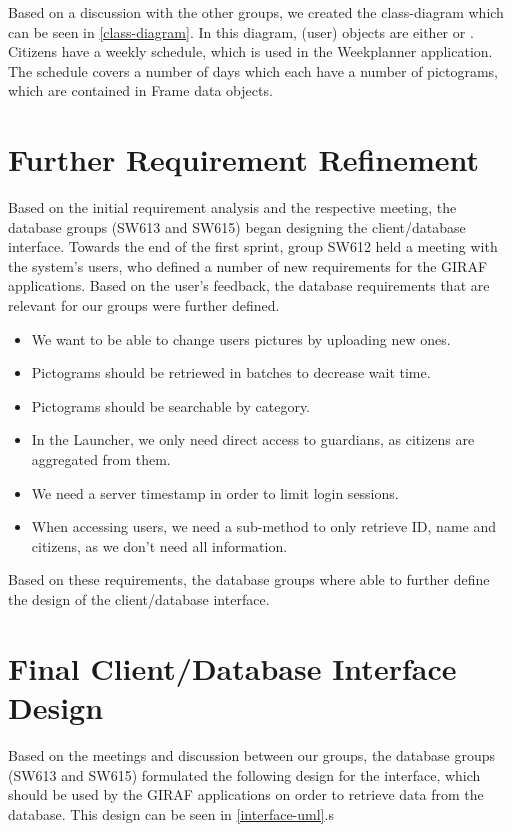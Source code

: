 Based on a discussion with the other groups, we created the class-diagram which
can be seen in \autoref{class-diagram}. In this diagram,  (user)
objects are either  or . Citizens have a
weekly schedule, which is used in the Weekplanner application. The schedule
covers a number of days which each have a number of pictograms, which are
contained in Frame data objects.


\section{Further Requirement Refinement}
Based on the initial requirement analysis and the respective meeting, the
database groups (SW613 and SW615) began designing the client/database interface.
Towards the end of the first sprint, group SW612 held a meeting with the
system's users, who defined a number of new requirements for the GIRAF
applications. Based on the user's feedback, the database requirements that are
relevant for our groups were further defined.

\begin{itemize}
  \item We want to be able to change users pictures by uploading new ones.
  \item Pictograms should be retriewed in batches to decrease wait time.
  \item Pictograms should be searchable by category.
  \item In the Launcher, we only need direct access to guardians, as citizens
  are aggregated from them.
  \item We need a server timestamp in order to limit login sessions.
  \item When accessing users, we need a sub-method to only retrieve ID, name and
  citizens, as we don't need all information.
\end{itemize}

Based on these requirements, the database groups where able to further define
the design of the client/database interface.

\section{Final Client/Database Interface Design}
Based on the meetings and discussion between our groups, the database groups
(SW613 and SW615) formulated the following design for the interface, which
should be used by the GIRAF applications on order to retrieve data from the
database. This design can be seen in \autoref{interface-uml}.s

